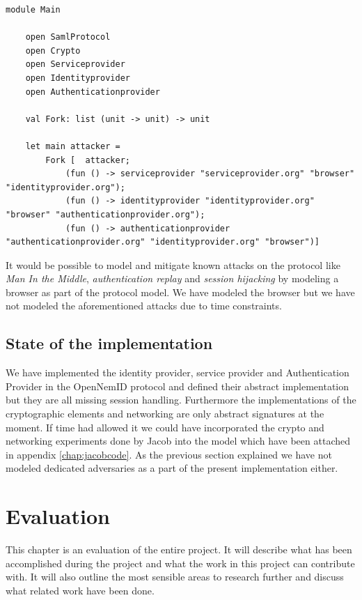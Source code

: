 \documentclass[twosided]{report}
\begin{document}
\begin{lstlisting}[style=fstar, caption={Main module for introducing adversaries}, label={list:adversary}]
	module Main

	open SamlProtocol
	open Crypto
	open Serviceprovider
	open Identityprovider
	open Authenticationprovider

	val Fork: list (unit -> unit) -> unit	

	let main attacker =	
		Fork [	attacker;
			(fun () -> serviceprovider "serviceprovider.org" "browser" "identityprovider.org");
			(fun () -> identityprovider "identityprovider.org" "browser" "authenticationprovider.org");
			(fun () -> authenticationprovider "authenticationprovider.org" "identityprovider.org" "browser")]
\end{lstlisting}

It would be possible to model and mitigate known attacks on the protocol like \emph{Man In the Middle}, \emph{authentication replay} and \emph{session hijacking} by modeling a browser as part of the protocol model. We have modeled the browser but we have not modeled the aforementioned attacks due to time constraints.

\section{State of the implementation}
We have implemented the identity provider, service provider and Authentication Provider in the OpenNemID protocol and defined their abstract implementation but they are all missing session handling. Furthermore the implementations of the cryptographic elements and networking are only abstract signatures at the moment. If time had allowed it we could have incorporated the crypto and networking experiments done by Jacob into the model which have been attached in appendix \ref{chap:jacobcode}. As the previous section explained we have not modeled dedicated adversaries as a part of the present implementation either.


\chapter{Evaluation}
This chapter is an evaluation of the entire project. It will describe what has been accomplished during the project and what the work in this project can contribute with. It will also outline the most sensible areas to research further and discuss what related work have been done.
\end{document}
